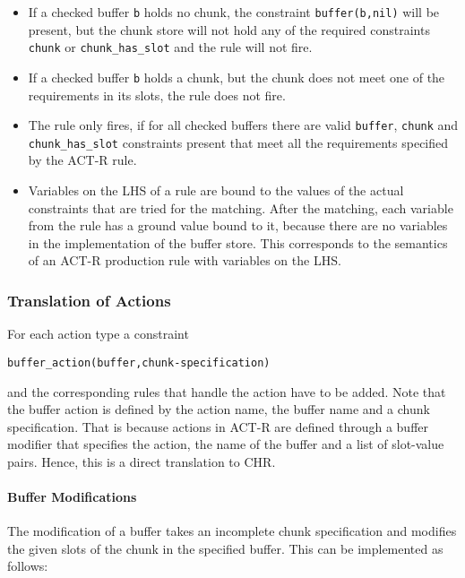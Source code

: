 \begin{itemize}
 \item If a checked buffer \lstinline|b| holds no chunk, the constraint \lstinline|buffer(b,nil)| will be present, but the chunk store will not hold any of the required constraints \lstinline|chunk| or \lstinline|chunk_has_slot| and the rule will not fire.
 \item If a checked buffer \lstinline|b| holds a chunk, but the chunk does not meet one of the requirements in its slots, the rule does not fire.
 \item The rule only fires, if for all checked buffers there are valid \lstinline|buffer|, \lstinline|chunk| and \lstinline|chunk_has_slot| constraints present that meet all the requirements specified by the ACT-R rule.
 \item Variables on the LHS of a rule are bound to the values of the actual constraints that are tried for the matching. After the matching, each variable from the rule has a ground value bound to it, because there are no variables in the implementation of the buffer store. This corresponds to the semantics of an ACT-R production rule with variables on the LHS.
\end{itemize}

\subsubsection{Translation of Actions}
\label{translation_of_actions}

For each action type a constraint

\begin{lstlisting}
buffer_action(buffer,chunk-specification)
\end{lstlisting}

and the corresponding rules that handle the action have to be added. Note that the buffer action is defined by the action name, the buffer name and a chunk specification. That is because actions in ACT-R are defined through a buffer modifier that specifies the action, the name of the buffer and a list of slot-value pairs. Hence, this is a direct translation to CHR.

\paragraph{Buffer Modifications}

The modification of a buffer takes an incomplete chunk specification and modifies the given slots of the chunk in the specified buffer. This can be implemented as follows:

